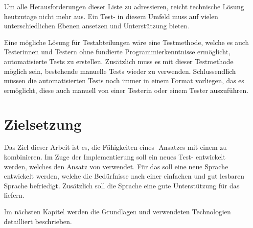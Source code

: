 \SuperPar
Um alle Herausforderungen dieser Liste zu adressieren, reicht  technische Lösung heutzutage nicht mehr aus. Ein Test- in diesem Umfeld muss auf vielen unterschiedlichen Ebenen ansetzen und Unterstützung bieten. 

\SuperPar
Eine mögliche Lösung für Testabteilungen wäre eine Testmethode, welche es auch Testerinnen und Testern ohne fundierte Programmierkenntnisse ermöglicht, automatisierte Tests zu erstellen. Zusätzlich muss es mit dieser Testmethode möglich sein, bestehende manuelle Tests wieder zu verwenden. Schlussendlich müssen die automatisierten Tests noch immer in einem Format vorliegen, das es ermöglicht, diese auch manuell von einer Testerin oder einem Tester auszuführen.


\section{Zielsetzung}

Das Ziel dieser Arbeit ist es, die Fähigkeiten eines -Ansatzes mit einem   zu kombinieren. Im Zuge der Implementierung soll ein neues Test- entwickelt werden, welches den Ansatz von  verwendet. Für das  soll eine neue Sprache entwickelt werden, welche die Bedürfnisse nach einer einfachen und gut lesbaren Sprache befriedigt. Zusätzlich soll die Sprache eine gute Unterstützung für das  liefern.

\SuperPar
Im nächsten Kapitel werden die Grundlagen und verwendeten Technologien detailliert beschrieben.